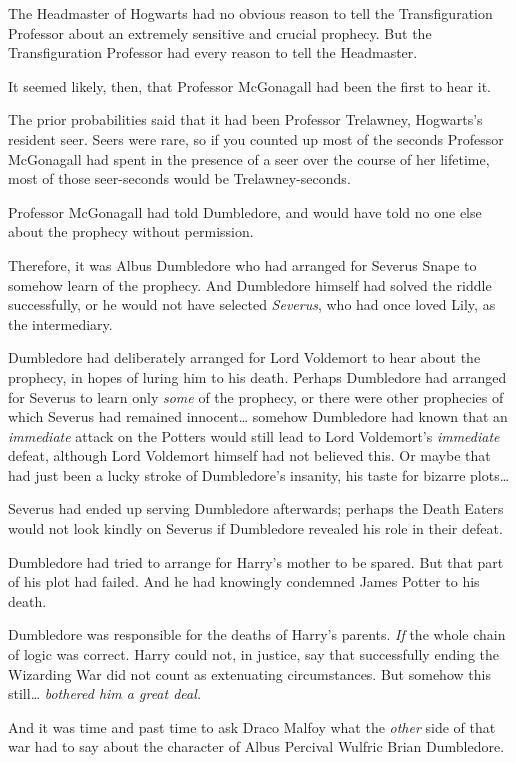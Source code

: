 The Headmaster of Hogwarts had no obvious reason to tell the Transfiguration Professor about an extremely sensitive and crucial prophecy. But the Transfiguration Professor had every reason to tell the Headmaster.

It seemed likely, then, that Professor McGonagall had been the first to hear it.

The prior probabilities said that it had been Professor Trelawney, Hogwarts's resident seer. Seers were rare, so if you counted up most of the seconds Professor McGonagall had spent in the presence of a seer over the course of her lifetime, most of those seer-seconds would be Trelawney-seconds.

Professor McGonagall had told Dumbledore, and would have told no one else about the prophecy without permission.

Therefore, it was Albus Dumbledore who had arranged for Severus Snape to somehow learn of the prophecy. And Dumbledore himself had solved the riddle successfully, or he would not have selected \emph{Severus}, who had once loved Lily, as the intermediary.

Dumbledore had deliberately arranged for Lord Voldemort to hear about the prophecy, in hopes of luring him to his death. Perhaps Dumbledore had arranged for Severus to learn only \emph{some} of the prophecy, or there were other prophecies of which Severus had remained innocent{\ldots} somehow Dumbledore had known that an \emph{immediate} attack on the Potters would still lead to Lord Voldemort's \emph{immediate} defeat, although Lord Voldemort himself had not believed this. Or maybe that had just been a lucky stroke of Dumbledore's insanity, his taste for bizarre plots{\ldots}

Severus had ended up serving Dumbledore afterwards; perhaps the Death Eaters would not look kindly on Severus if Dumbledore revealed his role in their defeat.

Dumbledore had tried to arrange for Harry's mother to be spared. But that part of his plot had failed. And he had knowingly condemned James Potter to his death.

Dumbledore was responsible for the deaths of Harry's parents. \emph{If} the whole chain of logic was correct. Harry could not, in justice, say that successfully ending the Wizarding War did not count as extenuating circumstances. But somehow this still{\ldots} \emph{bothered him a great deal.}

And it was time and past time to ask Draco Malfoy what the \emph{other} side of that war had to say about the character of Albus Percival Wulfric Brian Dumbledore.

